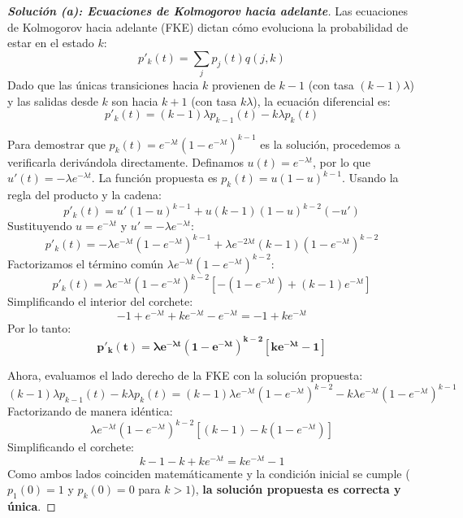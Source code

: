\documentclass[10pt,a4paper]{article}
\begin{document}
\vspace{2mm}

\begin{proof}[\textbf{Solución (a): Ecuaciones de Kolmogorov hacia adelante}]
    Las ecuaciones de Kolmogorov hacia adelante (FKE) dictan cómo evoluciona la probabilidad de estar en el estado $k$:
    \[ p'_k(t) = \sum_j p_j(t) q(j, k) \]
    Dado que las únicas transiciones hacia $k$ provienen de $k-1$ (con tasa $(k-1)\lambda$) y las salidas desde $k$ son hacia $k+1$ (con tasa $k\lambda$), la ecuación diferencial es:
    \[ p'_k(t) = (k-1)\lambda p_{k-1}(t) - k\lambda p_k(t) \]
    
    Para demostrar que $p_k(t) = e^{-\lambda t}(1 - e^{-\lambda t})^{k-1}$ es la solución, procedemos a verificarla derivándola directamente.
    Definamos $u(t) = e^{-\lambda t}$, por lo que $u'(t) = -\lambda e^{-\lambda t}$. La función propuesta es $p_k(t) = u(1-u)^{k-1}$.
    Usando la regla del producto y la cadena:
    \[ p'_k(t) = u'(1-u)^{k-1} + u(k-1)(1-u)^{k-2}(-u') \]
    Sustituyendo $u = e^{-\lambda t}$ y $u' = -\lambda e^{-\lambda t}$:
    \[ p'_k(t) = -\lambda e^{-\lambda t}(1 - e^{-\lambda t})^{k-1} + \lambda e^{-2\lambda t} (k-1)(1 - e^{-\lambda t})^{k-2} \]
    Factorizamos el término común $\lambda e^{-\lambda t}(1 - e^{-\lambda t})^{k-2}$:
    \[ p'_k(t) = \lambda e^{-\lambda t}(1 - e^{-\lambda t})^{k-2} \left[ -(1 - e^{-\lambda t}) + (k-1)e^{-\lambda t} \right] \]
    Simplificando el interior del corchete:
    \[ -1 + e^{-\lambda t} + k e^{-\lambda t} - e^{-\lambda t} = -1 + k e^{-\lambda t} \]
    Por lo tanto:
    \[ \mathbf{p'_k(t) = \lambda e^{-\lambda t}(1 - e^{-\lambda t})^{k-2} [ k e^{-\lambda t} - 1 ]} \]
    
    Ahora, evaluamos el lado derecho de la FKE con la solución propuesta:
    \[ (k-1)\lambda p_{k-1}(t) - k\lambda p_k(t) = (k-1)\lambda e^{-\lambda t}(1-e^{-\lambda t})^{k-2} - k\lambda e^{-\lambda t}(1-e^{-\lambda t})^{k-1} \]
    Factorizando de manera idéntica:
    \[ \lambda e^{-\lambda t}(1 - e^{-\lambda t})^{k-2} \left[ (k-1) - k(1 - e^{-\lambda t}) \right] \]
    Simplificando el corchete:
    \[ k - 1 - k + k e^{-\lambda t} = k e^{-\lambda t} - 1 \]
    Como ambos lados coinciden matemáticamente y la condición inicial se cumple ($p_1(0) = 1$ y $p_k(0) = 0$ para $k > 1$), \textbf{la solución propuesta es correcta y única}.
\end{proof}

\vspace{5mm}
\end{document}
